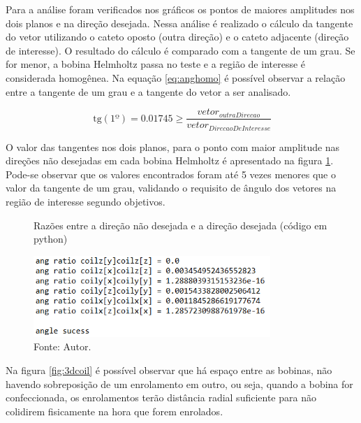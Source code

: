 Para a análise foram verificados nos gráficos os pontos de maiores amplitudes nos dois planos e na direção desejada. Nessa análise é realizado o cálculo da tangente do vetor utilizando o cateto oposto (outra direção) e o cateto adjacente (direção de interesse). O resultado do cálculo é comparado com a tangente de um grau. Se for menor, a bobina Helmholtz passa no teste e a região de interesse é considerada homogênea. Na equação \ref{eq:anghomo} é possível observar a relação entre a tangente de um grau e a tangente do vetor a ser analisado.

\begin{equation}
    \hspace{2pt}\textrm{tg}(1º) = 0.01745 \geq \frac{vetor_{outraDirecao}}{vetor_{DirecaoDeInteresse}}
    \label{eq:anghomo}
\end{equation}

O valor das tangentes nos dois planos, para o ponto com maior amplitude nas direções não desejadas em cada bobina Helmholtz é apresentado na figura \ref{fig:raz}. Pode-se observar que os valores encontrados foram até 5 vezes menores que o valor da tangente de um grau, validando o requisito de ângulo dos vetores na região de interesse segundo objetivos.

\begin{figure}[H]
    \centering
     \caption{Razões entre a direção não desejada e a direção desejada (código em python)}
     \includegraphics[width=0.8\textwidth]{./img/simulacao/angulo_console.png}
     \caption*{Fonte: Autor.}\label{fig:raz}
\end{figure}

Na figura \ref{fig:3dcoil} é possível observar que há espaço entre as bobinas, não havendo sobreposição de um enrolamento em outro, ou seja, quando a bobina for confeccionada, os enrolamentos terão distância radial suficiente para não colidirem fisicamente na hora que forem enrolados.

